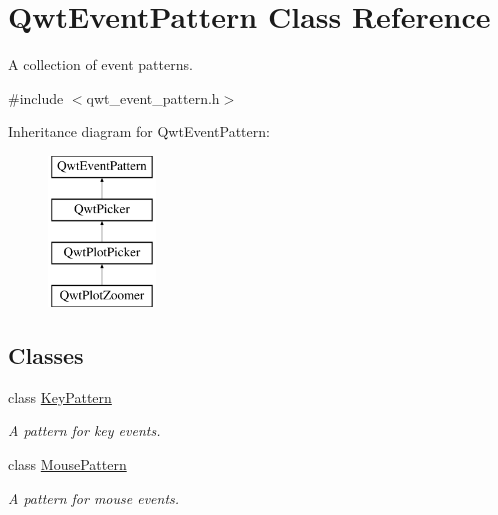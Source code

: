 \hypertarget{class_qwt_event_pattern}{\section{Qwt\-Event\-Pattern Class Reference}
\label{class_qwt_event_pattern}
}


A collection of event patterns.  




{\ttfamily \#include $<$qwt\-\_\-event\-\_\-pattern.\-h$>$}

Inheritance diagram for Qwt\-Event\-Pattern\-:\begin{figure}[H]
\begin{center}
\leavevmode
\includegraphics[height=4.000000cm]{class_qwt_event_pattern}
\end{center}
\end{figure}
\subsection*{Classes}
\begin{DoxyCompactItemize}
\item 
class \hyperlink{class_qwt_event_pattern_1_1_key_pattern}{Key\-Pattern}
\begin{DoxyCompactList}\small\item\em A pattern for key events. \end{DoxyCompactList}\item 
class \hyperlink{class_qwt_event_pattern_1_1_mouse_pattern}{Mouse\-Pattern}
\begin{DoxyCompactList}\small\item\em A pattern for mouse events. \end{DoxyCompactList}\end{DoxyCompactItemize}
